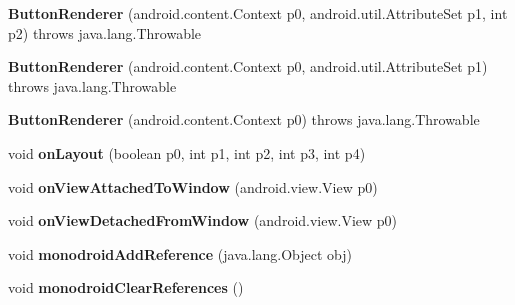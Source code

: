\begin{DoxyCompactItemize}
\item 
\mbox{\label{classmd5270abb39e60627f0f200893b490a1ade_1_1_button_renderer_a69de53fe1b8c1bd7f640db6eef322fdd}} 
{\bfseries Button\+Renderer} (android.\+content.\+Context p0, android.\+util.\+Attribute\+Set p1, int p2)  throws java.\+lang.\+Throwable 	
\item 
\mbox{\label{classmd5270abb39e60627f0f200893b490a1ade_1_1_button_renderer_a032b2a49be9b19da3e846d539da04e80}} 
{\bfseries Button\+Renderer} (android.\+content.\+Context p0, android.\+util.\+Attribute\+Set p1)  throws java.\+lang.\+Throwable 	
\item 
\mbox{\label{classmd5270abb39e60627f0f200893b490a1ade_1_1_button_renderer_aca79f33076eb791b82fb74d4075b5805}} 
{\bfseries Button\+Renderer} (android.\+content.\+Context p0)  throws java.\+lang.\+Throwable 	
\item 
\mbox{\label{classmd5270abb39e60627f0f200893b490a1ade_1_1_button_renderer_af2e3875cd2b7a03f7278f91e55939532}} 
void {\bfseries on\+Layout} (boolean p0, int p1, int p2, int p3, int p4)
\item 
\mbox{\label{classmd5270abb39e60627f0f200893b490a1ade_1_1_button_renderer_a096ced78b676353ccc21296f8eb579a3}} 
void {\bfseries on\+View\+Attached\+To\+Window} (android.\+view.\+View p0)
\item 
\mbox{\label{classmd5270abb39e60627f0f200893b490a1ade_1_1_button_renderer_a197f3e7692578540f0931faffb7d50d0}} 
void {\bfseries on\+View\+Detached\+From\+Window} (android.\+view.\+View p0)
\item 
\mbox{\label{classmd5270abb39e60627f0f200893b490a1ade_1_1_button_renderer_a777673af96186211dacdc043e03e29c4}} 
void {\bfseries monodroid\+Add\+Reference} (java.\+lang.\+Object obj)
\item 
\mbox{\label{classmd5270abb39e60627f0f200893b490a1ade_1_1_button_renderer_a85b560fcbb7fbef8f3ec48b9bf724210}} 
void {\bfseries monodroid\+Clear\+References} ()
\end{DoxyCompactItemize}
